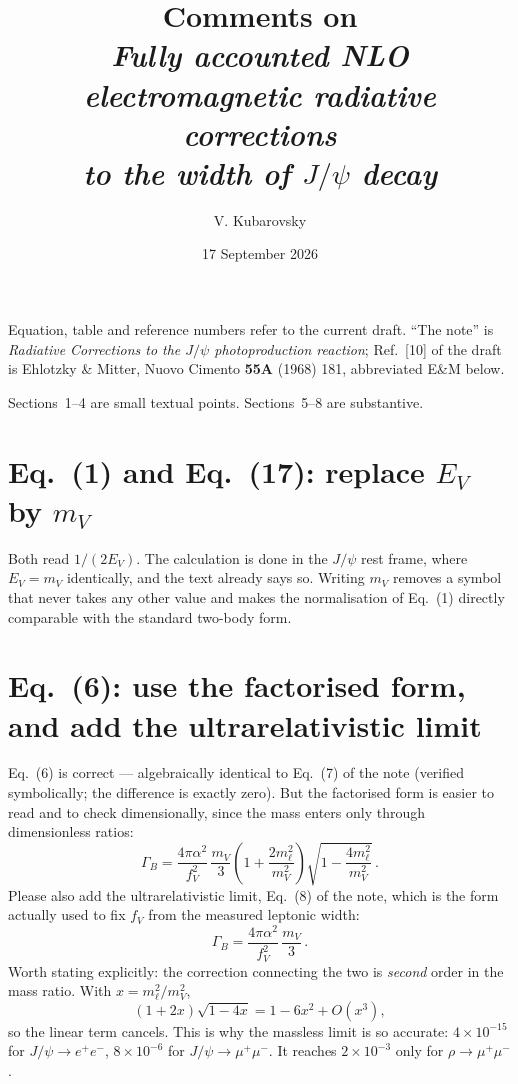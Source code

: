 \documentclass[11pt]{article}
\title{\vspace{-2em}Comments on\\[0.3em]
\emph{Fully accounted NLO electromagnetic radiative corrections\\
to the width of $J/\psi$ decay}}
\author{V. Kubarovsky}
\date{17 September 2026}
\begin{document}
\maketitle
\vspace{-1em}

\noindent
Equation, table and reference numbers refer to the current draft. ``The note''
is \emph{Radiative Corrections to the $J/\psi$ photoproduction reaction};
Ref.~[10] of the draft is Ehlotzky \& Mitter, Nuovo Cimento \textbf{55A} (1968)
181, abbreviated E\&M below.

Sections~1--4 are small textual points. Sections~5--8 are substantive.

\section{Eq.~(1) and Eq.~(17): replace $E_V$ by $m_V$}

Both read $1/(2E_V)$. The calculation is done in the $J/\psi$ rest frame, where
$E_V=m_V$ identically, and the text already says so. Writing $m_V$ removes a
symbol that never takes any other value and makes the normalisation of Eq.~(1)
directly comparable with the standard two-body form.

\section{Eq.~(6): use the factorised form, and add the ultrarelativistic limit}

Eq.~(6) is correct --- algebraically identical to Eq.~(7) of the note (verified
symbolically; the difference is exactly zero). But the factorised form is easier
to read and to check dimensionally, since the mass enters only through
dimensionless ratios:
\begin{equation*}
\Gamma_B=\frac{4\pi\alpha^{2}}{f_V^{2}}\,\frac{m_V}{3}
\left(1+\frac{2m_\ell^{2}}{m_V^{2}}\right)\sqrt{1-\frac{4m_\ell^{2}}{m_V^{2}}}\,.
\end{equation*}
Please also add the ultrarelativistic limit, Eq.~(8) of the note, which is the
form actually used to fix $f_V$ from the measured leptonic width:
\begin{equation*}
\Gamma_B=\frac{4\pi\alpha^{2}}{f_V^{2}}\,\frac{m_V}{3}\,.
\end{equation*}
Worth stating explicitly: the correction connecting the two is \emph{second} order
in the mass ratio. With $x=m_\ell^{2}/m_V^{2}$,
\begin{equation*}
(1+2x)\sqrt{1-4x}=1-6x^{2}+O(x^{3}),
\end{equation*}
so the linear term cancels. This is why the massless limit is so accurate:
$4\times10^{-15}$ for $J/\psi\to e^+e^-$, $8\times10^{-6}$ for
$J/\psi\to\mu^+\mu^-$. It reaches $2\times10^{-3}$ only for $\rho\to\mu^+\mu^-$.
\end{document}
